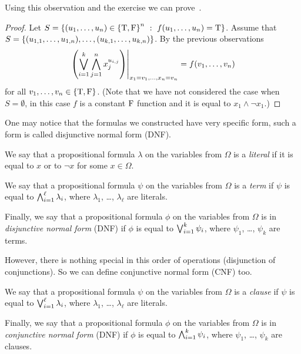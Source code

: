 Using this observation and the exercise we can
prove~.
\begin{proof}
  Let $S = \set[f(u_1, \dots, u_n) = \ltrue]{(u_1, \dots, u_n) \in
    \set{\ltrue, \lfalse}^n}$.
  Assume that
  $S = \set{(u_{1, 1}, \dots, u_{1, n}), \dots, (u_{k, 1}, \dots, u_{k, n})}$.
  By the previous observations
  \[
    \left. {
      \left(
        \bigvee_{i = 1}^k
          \bigwedge_{j = 1}^n x_j^{u_{i, j}}
      \right)
    } \right\rvert_{x_1 = v_1, \dots, x_n = v_n}
    =
    f(v_1, \dots, v_n)
  \]
  for all $v_1, \dots, v_n \in \set{\ltrue, \lfalse}$.
  (Note that we have not considered the case when $S = \emptyset$, in this
  case $f$ is a constant $\text{F}$ function and it is equal to
  $x_1 \land \lnot x_1$.)
\end{proof}

One may notice that the formulas we constructed have very specific form,
such a form is called disjunctive normal form (DNF).
\begin{definition}
  We say that a propositional formula $\lambda$ on the variables from $\Omega$
  is a \emph{literal} if it is equal to $x$ or to $\lnot x$ for some
  $x \in \Omega$.

  We say that a propositional formula $\psi$ on the variables from $\Omega$ is
  a \emph{term} if $\psi$ is equal to $\bigwedge_{i = 1}^\ell \lambda_i$, where $\lambda_1$, \dots, $\lambda_\ell$ are literals.

  Finally, we say that a propositional formula $\phi$ on the variables from
  $\Omega$ is in \emph{disjunctive normal form} (DNF) if $\phi$ is equal to
  $\bigvee_{i = 1}^k \psi_i$, where $\psi_1$, \dots, $\psi_k$ are
  terms.
\end{definition}

However, there is nothing special in this order of operations (disjunction of
conjunctions). So we can define conjunctive normal form (CNF) too.
\begin{definition}
  We say that a propositional formula $\psi$ on the variables from $\Omega$ is
  a \emph{clause} if $\psi$ is equal to $\bigvee_{i = 1}^\ell \lambda_i$, where
  $\lambda_1$, \dots, $\lambda_\ell$ are literals.

  Finally, we say that a propositional formula $\phi$ on the variables from
  $\Omega$ is in \emph{conjunctive normal form} (DNF) if $\phi$ is equal to
  $\bigwedge_{i = 1}^k \psi_i$, where $\psi_1$, \dots, $\psi_k$ are
  clauses.
\end{definition}

